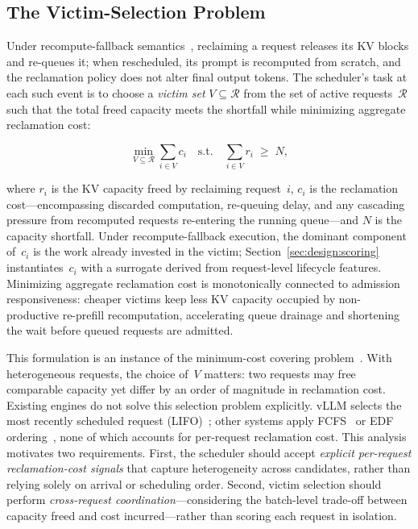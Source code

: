\documentclass[conference]{IEEEtran}
\begin{document}
\subsection{The Victim-Selection Problem}\label{sec:bg:preemption}

Under recompute-fallback semantics~\cite{Kwon2023}, reclaiming a request
releases its KV blocks and re-queues it; when rescheduled, its prompt is
recomputed from scratch, and the reclamation policy does not alter final output
tokens.  The scheduler's task at each such event
is to choose a \emph{victim set} $V \subseteq \mathcal{R}$ from the set of
active requests~$\mathcal{R}$ such that the total freed capacity meets the
shortfall while minimizing aggregate reclamation cost:

\begin{equation}\label{eq:victim}
  \min_{V \subseteq \mathcal{R}} \sum_{i \in V} c_i
  \quad \text{s.t.} \quad
  \sum_{i \in V} r_i \;\geq\; N,
\end{equation}

\noindent
where $r_i$ is the KV capacity freed by reclaiming request~$i$, $c_i$ is the
reclamation cost---encompassing discarded computation, re-queuing delay,
and any cascading pressure from recomputed requests re-entering the running
queue---and $N$ is the capacity shortfall.  Under recompute-fallback execution,
the dominant component of~$c_i$ is the work already invested in the victim;
Section~\ref{sec:design:scoring} instantiates~$c_i$ with a surrogate derived
from request-level lifecycle features.
Minimizing aggregate reclamation cost is monotonically connected to admission
responsiveness: cheaper victims keep less KV capacity occupied by
non-productive re-prefill recomputation, accelerating queue drainage and
shortening the wait before queued requests are admitted.

This formulation is an instance of the minimum-cost covering
problem~\cite{Kellerer2004}.  With heterogeneous requests, the choice of~$V$
matters: two requests may free comparable capacity yet differ by an order of
magnitude in reclamation cost.
Existing engines do not solve this selection problem explicitly.  vLLM selects
the most recently scheduled request (LIFO)~\cite{Kwon2023}; other systems apply
FCFS~\cite{Yu2022} or EDF ordering~\cite{Gujarati2020}, none of which accounts
for per-request reclamation cost.  This
analysis motivates two requirements.  First, the scheduler should accept
\emph{explicit per-request reclamation-cost signals} that capture
heterogeneity across candidates, rather than relying solely on arrival or
scheduling order.  Second, victim selection should perform \emph{cross-request
coordination}---considering the batch-level trade-off between capacity freed
and cost incurred---rather than scoring each request in isolation.
\end{document}
